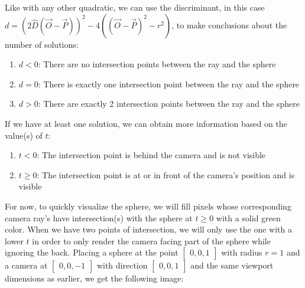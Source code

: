 Like with any other quadratic, we can use the discriminant, in this case $d = (2\hat{D}(\Vec{O}-\Vec{P}))^2 - 4((\Vec{O}-\Vec{P})^2-r^2)$, to make conclusions about the number of solutions:
\begin{enumerate}
    \item $d < 0$: There are no intersection points between the ray and the sphere
    \item $d = 0$: There is exactly one intersection point between the ray and the sphere
    \item $d > 0$: There are exactly 2 intersection points between the ray and the sphere
\end{enumerate}
If we have at least one solution, we can obtain more information based on the value(s) of $t$:
\begin{enumerate}
    \item $t < 0$: The intersection point is behind the camera and is not visible
    \item $t \geq 0$: The intersection point is at or in front of the camera's position and is visible
\end{enumerate}
For now, to quickly visualize the sphere, we will fill pixels whose corresponding camera ray's have intersection(s) with the sphere at $t \geq 0$ with a solid green color. When we have two points of intersection, we will only use the one with a lower $t$ in order to only render the camera facing part of the sphere while ignoring the back. Placing a sphere at the point $\begin{bmatrix} 0, 0, 1 \end{bmatrix}$ with radius $r = 1$ and a camera at $\begin{bmatrix} 0, 0, -1 \end{bmatrix}$ with direction $\begin{bmatrix} 0, 0, 1 \end{bmatrix}$ and the same viewport dimensions as earlier, we get the following image:

